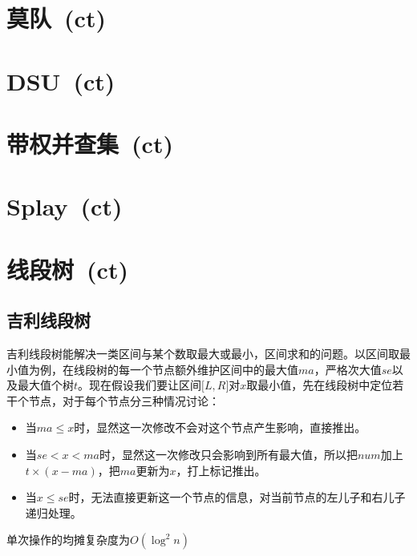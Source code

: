 \section{莫队\ \small(ct)}
\section{DSU\ \small(ct)}
\section{带权并查集\ \small(ct)}
\section{Splay\ \small(ct)}
\section{线段树\ \small(ct)}
	\subsection*{吉利线段树}
		吉利线段树能解决一类区间与某个数取最大或最小，区间求和的问题。以区间取最小值为例，在线段树的每一个节点额外维护区间中的最大值$ ma $，严格次大值$ se $以及最大值个树$ t $。现在假设我们要让区间$ \lbrack L, R \rbrack $对$ x $取最小值，先在线段树中定位若干个节点，对于每个节点分三种情况讨论：
		\begin{itemize}[nosep,wide=0pt]
			\item 当$ ma \leq x $时，显然这一次修改不会对这个节点产生影响，直接推出。
			\item 当$ se < x < ma $时，显然这一次修改只会影响到所有最大值，所以把$ num $加上$ t \times (x - ma) $，把$ ma $更新为$ x $，打上标记推出。
			\item 当$ x \leq se $时，无法直接更新这一个节点的信息，对当前节点的左儿子和右儿子递归处理。
		\end{itemize}
		单次操作的均摊复杂度为$ O(\log^2 n) $
